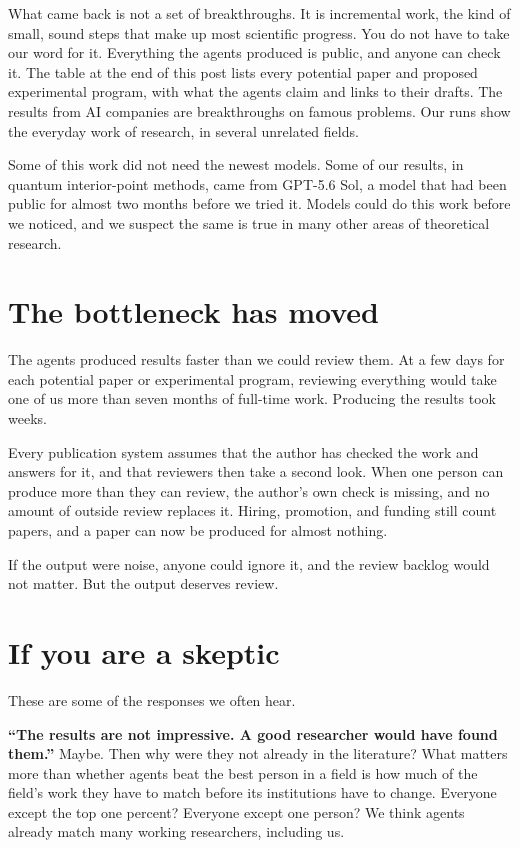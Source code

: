 \documentclass[11pt]{article}
\begin{document}
What came back is not a set of breakthroughs.
It is incremental work, the kind of small, sound steps that make up most scientific progress.
You do not have to take our word for it.
Everything the agents produced is public, and anyone can check it.
The table at the end of this post lists every potential paper and proposed experimental program, with what the agents claim and links to their drafts.
The results from AI companies are breakthroughs on famous problems.
Our runs show the everyday work of research, in several unrelated fields.

Some of this work did not need the newest models.
Some of our results, in quantum interior-point methods, came from GPT-5.6 Sol, a model that had been public for almost two months before we tried it.
Models could do this work before we noticed, and we suspect the same is true in many other areas of theoretical research.

\section*{The bottleneck has moved}

The agents produced results faster than we could review them.
At a few days for each potential paper or experimental program, reviewing everything would take one of us more than seven months of full-time work.
Producing the results took weeks.

Every publication system assumes that the author has checked the work and answers for it, and that reviewers then take a second look.
When one person can produce more than they can review, the author's own check is missing, and no amount of outside review replaces it.
Hiring, promotion, and funding still count papers, and a paper can now be produced for almost nothing.

If the output were noise, anyone could ignore it, and the review backlog would not matter.
But the output deserves review.

\section*{If you are a skeptic}

These are some of the responses we often hear.

\textbf{``The results are not impressive. A good researcher would have found them.''}
Maybe.
Then why were they not already in the literature?
What matters more than whether agents beat the best person in a field is how much of the field's work they have to match before its institutions have to change.
Everyone except the top one percent?
Everyone except one person?
We think agents already match many working researchers, including us.
\end{document}
